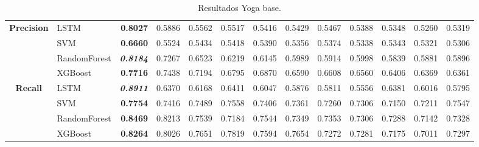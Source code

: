 \begin{table}[H]
\begin{adjustbox}{max width=12cm}
\begin{tabular}{|c|l|r|r|r|r|r|r|r|r|r|r|r|}
			\hline
			\textbf{Precision} &  LSTM & \textbf{  0.8027 } &  0.5886 &  0.5562 &  0.5517 &  0.5416 &  0.5429 &  0.5467 &  0.5388 &  0.5348 &  0.5260 &  0.5319 \\
			&  SVM & \textbf{  0.6660 } &  0.5524 &  0.5434 &  0.5418 &  0.5390 &  0.5356 &  0.5374 &  0.5338 &  0.5343 &  0.5321 &  0.5306 \\
			&  RandomForest & \textit{ \textbf{  0.8184 } } &  0.7267 &  0.6523 &  0.6219 &  0.6145 &  0.5989 &  0.5914 &  0.5998 &  0.5839 &  0.5881 &  0.5896 \\
			&  XGBoost & \textbf{  0.7716 } &  0.7438 &  0.7194 &  0.6795 &  0.6870 &  0.6590 &  0.6608 &  0.6560 &  0.6406 &  0.6369 &  0.6361 \\
			\hline
			\textbf{Recall} &  LSTM & \textit{ \textbf{  0.8911 } } &  0.6370 &  0.6168 &  0.6411 &  0.6047 &  0.5876 &  0.5811 &  0.5556 &  0.6381 &  0.6016 &  0.5795 \\
			&  SVM & \textbf{  0.7754 } &  0.7416 &  0.7489 &  0.7558 &  0.7406 &  0.7361 &  0.7260 &  0.7306 &  0.7150 &  0.7211 &  0.7547 \\
			&  RandomForest & \textbf{  0.8469 } &  0.8213 &  0.7539 &  0.7184 &  0.7544 &  0.7349 &  0.7353 &  0.7306 &  0.7288 &  0.7142 &  0.7328 \\
			&  XGBoost & \textbf{  0.8264 } &  0.8026 &  0.7651 &  0.7819 &  0.7594 &  0.7654 &  0.7272 &  0.7281 &  0.7175 &  0.7011 &  0.7297 \\
			\hline
		\end{tabular}
	\end{adjustbox}
	\caption{Resultados Yoga base.}
	\label{tab:Yoga_base}
\end{table}

